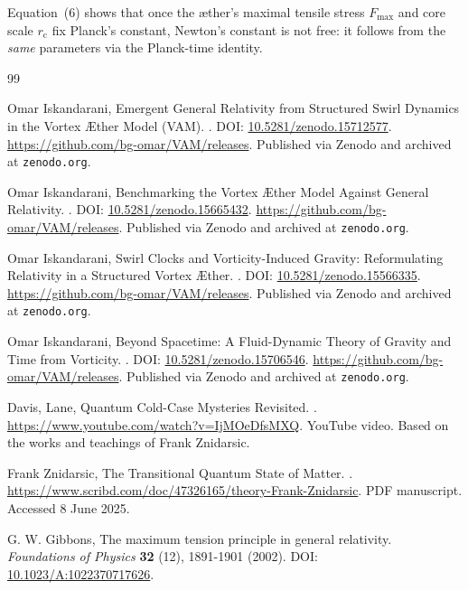 \documentclass[a4paper,12pt]{article}
\begin{document}
Equation~(6) shows that once the æther’s maximal tensile stress $F_{\max}$ and core scale $r_{\mathrm{c}}$ fix Planck’s constant, Newton’s constant is not free: it follows from the \textit{same} parameters via the Planck-time identity.
\begin{thebibliography}{99}

Omar Iskandarani,
\newblock Emergent General Relativity from Structured Swirl Dynamics in the Vortex Æther Model (VAM).
.
\newblock DOI: \href{https://doi.org/10.5281/zenodo.15712577}{10.5281/zenodo.15712577}.
\newblock \url{https://github.com/bg-omar/VAM/releases}.
\newblock Published via Zenodo and archived at \texttt{zenodo.org}.


Omar Iskandarani,
\newblock Benchmarking the Vortex Æther Model Against General Relativity.
.
\newblock DOI: \href{https://doi.org/10.5281/zenodo.15665432}{10.5281/zenodo.15665432}.
\newblock \url{https://github.com/bg-omar/VAM/releases}.
\newblock Published via Zenodo and archived at \texttt{zenodo.org}.


Omar Iskandarani,
\newblock Swirl Clocks and Vorticity-Induced Gravity: Reformulating Relativity in a Structured Vortex Æther.
.
\newblock DOI: \href{https://doi.org/10.5281/zenodo.15566335}{10.5281/zenodo.15566335}.
\newblock \url{https://github.com/bg-omar/VAM/releases}.
\newblock Published via Zenodo and archived at \texttt{zenodo.org}.


Omar Iskandarani,
\newblock Beyond Spacetime: A Fluid-Dynamic Theory of Gravity and Time from Vorticity.
.
\newblock DOI: \href{https://doi.org/10.5281/zenodo.15706546}{10.5281/zenodo.15706546}.
\newblock \url{https://github.com/bg-omar/VAM/releases}.
\newblock Published via Zenodo and archived at \texttt{zenodo.org}.


Davis, Lane,
\newblock Quantum Cold-Case Mysteries Revisited.
.
\newblock \url{https://www.youtube.com/watch?v=IjMOeDfsMXQ}.
\newblock YouTube video.
\newblock Based on the works and teachings of Frank Znidarsic.


Frank Znidarsic,
\newblock The Transitional Quantum State of Matter.
.
\newblock \url{https://www.scribd.com/doc/47326165/theory-Frank-Znidarsic}.
\newblock PDF manuscript.
\newblock Accessed 8 June 2025.


G. W. Gibbons,
\newblock The maximum tension principle in general relativity.
\textit{Foundations of Physics} \textbf{32} (12), 1891-1901 (2002).
\newblock DOI: \href{https://doi.org/10.1023/A:1022370717626}{10.1023/A:1022370717626}.



\end{thebibliography}
\end{document}
